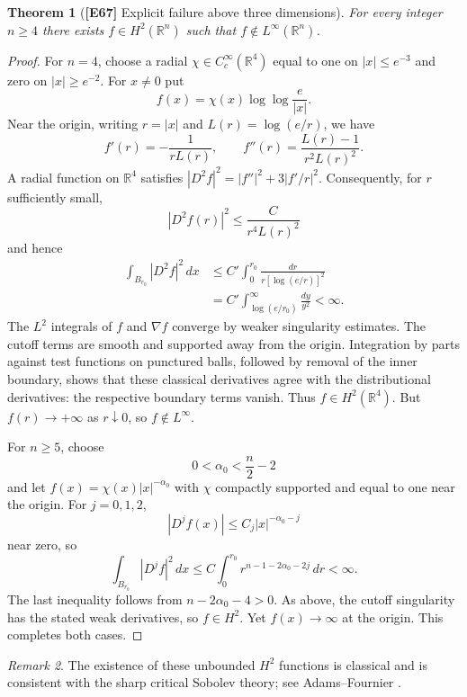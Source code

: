\documentclass[11pt,letterpaper]{article}
\newtheorem{theorem}{Theorem}[section]
\theoremstyle{definition}
\theoremstyle{remark}
\newtheorem{remark}[theorem]{Remark}
\newcommand{\R}{\mathbb R}
\newcommand{\abs}[1]{\left\lvert#1\right\rvert}
\newcommand{\id}[1]{\textnormal{\textbf{[#1]}}}
\begin{document}
\begin{theorem}[\id{E67} Explicit failure above three dimensions]\label{thm:failure}
For every integer $n\ge4$ there exists $f\in H^2(\R^n)$ such that
$f\notin L^\infty(\R^n)$.
\end{theorem}
\begin{proof}
For $n=4$, choose a radial $\chi\in C_c^\infty(\R^4)$ equal to one on
$\abs x\le e^{-3}$ and zero on $\abs x\ge e^{-2}$. For $x\ne0$ put
\begin{equation*}
f(x)=\chi(x)\log\log\frac e{\abs x}.
\end{equation*}
Near the origin, writing $r=\abs x$ and $L(r)=\log(e/r)$, we have
\begin{equation*}
f'(r)=-\frac1{rL(r)},\qquad
f''(r)=\frac{L(r)-1}{r^2L(r)^2}.
\end{equation*}
A radial function on $\R^4$ satisfies
$\abs{D^2f}^2=\abs{f''}^2+3\abs{f'/r}^2$.
Consequently, for $r$ sufficiently small,
\begin{equation*}
\abs{D^2f(r)}^2\le\frac C{r^4L(r)^2}
\end{equation*}
and hence
\begin{align*}
\int_{B_{r_0}}\abs{D^2f}^2\,dx
&\le C'\int_0^{r_0}\frac{dr}{r[\log(e/r)]^2}\\
&=C'\int_{\log(e/r_0)}^\infty\frac{dy}{y^2}<\infty.
\end{align*}
The $L^2$ integrals of $f$ and $\nabla f$ converge by weaker
singularity estimates. The cutoff terms are smooth and supported away
from the origin. Integration by parts against test functions on punctured
balls, followed by removal of the inner boundary, shows that these
classical derivatives agree with the distributional derivatives:
the respective boundary terms vanish. Thus $f\in H^2(\R^4)$.
But $f(r)\to+\infty$ as $r\downarrow0$, so $f\notin L^\infty$.

For $n\ge5$, choose
\begin{equation*}
0<\alpha_0<\frac n2-2
\end{equation*}
and let $f(x)=\chi(x)\abs x^{-\alpha_0}$ with $\chi$ compactly
supported and equal to one near the origin. For $j=0,1,2$,
\begin{equation*}
\abs{D^jf(x)}\le C_j\abs x^{-\alpha_0-j}
\end{equation*}
near zero, so
\begin{equation*}
\int_{B_{r_0}}\abs{D^jf}^2\,dx\le
C\int_0^{r_0}r^{n-1-2\alpha_0-2j}\,dr<\infty.
\end{equation*}
The last inequality follows from $n-2\alpha_0-4>0$. As above,
the cutoff singularity has the stated weak derivatives, so $f\in H^2$.
Yet $f(x)\to\infty$ at the origin. This completes both cases.
\end{proof}
\begin{remark}
The existence of these unbounded $H^2$ functions is classical and is
consistent with the sharp critical Sobolev theory; see
Adams--Fournier \cite{adamsfournier}.
\end{remark}
\end{document}
